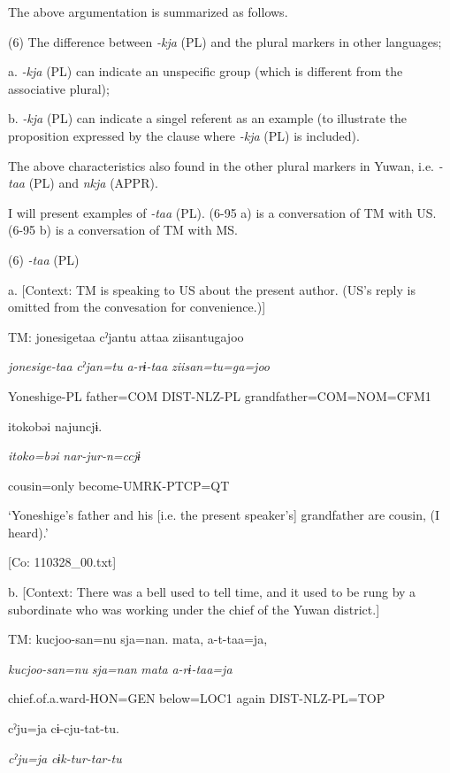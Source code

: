 The above argumentation is summarized as follows.

(6)  The difference between \textit{{}-kja} (PL) and the plural markers in other languages;

  a.  \textit{{}-kja} (PL) can indicate an unspecific group (which is different from the associative plural);

  b.  \textit{{}-kja} (PL) can indicate a singel referent as an example (to illustrate the proposition expressed by the clause where \textit{{}-kja} (PL) is included).

The above characteristics also found in the other plural markers in Yuwan, i.e. \textit{{}-taa} (PL) and \textit{nkja} (APPR).

I will present examples of \textit{{}-taa} (PL). (6-95 a) is a conversation of TM with US. (6-95 b) is a conversation of TM with MS.

(6)  \textit{{}-taa} (PL)

  a.  [Context: TM is speaking to US about the present author. (US’s reply is omitted from the convesation for convenience.)]

    TM:  jonesigetaa  cˀjantu  attaa  ziisantugajoo

      \textit{jonesige-taa}  \textit{cˀjan=tu}  \textit{a-rɨ-taa}  \textit{ziisan=tu=ga=joo}

      Yoneshige-PL  father=COM  DIST-NLZ-PL  grandfather=COM=NOM=CFM1

      {\textbar}itoko{\textbar}bəi  najuncjɨ.

      \textit{itoko=bəi}  \textit{nar-jur-n=ccjɨ}

      cousin=only  become-UMRK-PTCP=QT

      ‘Yoneshige’s father and his [i.e. the present speaker’s] grandfather are cousin, (I heard).’

      [Co: 110328\_00.txt]

  b.  [Context: There was a bell used to tell time, and it used to be rung by a subordinate who was working under the chief of the Yuwan district.]

    TM:  kucjoo-san=nu  sja=nan.  mata,  a-t-taa=ja,

      \textit{kucjoo-san=nu}  \textit{sja=nan}  \textit{mata}  \textit{a-rɨ-taa=ja}

      chief.of.a.ward-HON=GEN  below=LOC1  again  DIST-NLZ-PL=TOP

      cˀju=ja  cɨ-cju-tat-tu.

      \textit{cˀju=ja}  \textit{cɨk-tur-tar-tu}

